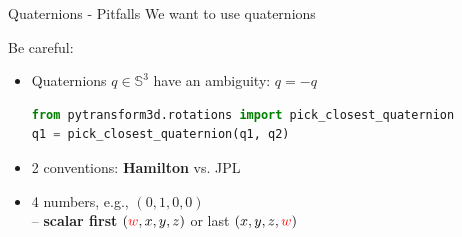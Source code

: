 \documentclass[14pt]{beamer}
\begin{document}
\begin{frame}[fragile]{Quaternions - Pitfalls}
We want to use quaternions \parencite{Ude2014}

\vskip 1cm

Be careful:
\begin{itemize}
\item Quaternions $q \in \mathbb{S}^3$ have an ambiguity: $q = -q$
\begin{lstlisting}[language=Python]
from pytransform3d.rotations import pick_closest_quaternion
q1 = pick_closest_quaternion(q1, q2)
\end{lstlisting}
\item 2 conventions: \textbf{Hamilton} vs. JPL\\\parencite{Sommer2018}
\item 4 numbers, e.g., $(0, 1, 0, 0)$\\
-- \textbf{scalar first} $(\textcolor{red}{w}, x, y, z)$ or last
$(x, y, z, \textcolor{red}{w})$
\end{itemize}
\end{frame}
\end{document}
